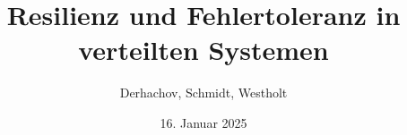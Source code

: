 \newcommand{\titel}{Resilienz und Fehlertoleranz in verteilten Systemen}
\newcommand{\untertitel}{}
\newcommand{\arbeit}{Modul \enquote{Software Engineering}}
\newcommand{\hochschuleLong}{Hochschule für Technik, Wirtschaft und Kultur Leipzig}
\newcommand{\hochschule}{HTWK Leipzig}
\newcommand{\fachbereichLong}{Fakultät Informatik und Medien}
\newcommand{\fachbereich}{FIM}
\newcommand{\autor}{Derhachov, Schmidt, Westholt}
\newcommand{\studiengang}{Masterstudiengang Informatik}
\newcommand{\erstgutachter}{Prof. Dr. Andreas Both, HTWK Leipzig}
\newcommand{\ort}{Leipzig}

\title{\titel}
\author{\autor}
\fakultaet{\fachbereich}
\date{16. Januar 2025}
